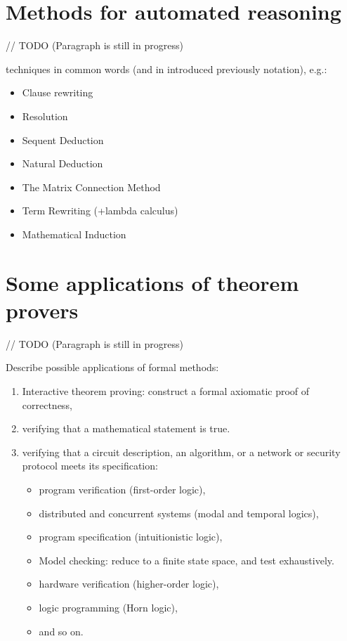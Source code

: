 \documentclass[article]{aaltoseries}
\begin{document}

\section{Methods for automated reasoning}
\label{sec:auto_reasoning}

// TODO (Paragraph is still in progress)

techniques in common words (and in introduced previously notation), e.g.: 
\begin{itemize}
\itemsep0em
	\item Clause rewriting
	\item Resolution
	\item Sequent Deduction
	\item Natural Deduction
	\item The Matrix Connection Method
	\item Term Rewriting (+lambda calculus)
	\item Mathematical Induction
\end{itemize}




\section{Some applications of theorem provers}
\label{sec:applications}

// TODO (Paragraph is still in progress) 

Describe possible applications of formal methods:
\begin{enumerate}
	\itemsep0em
	\item Interactive theorem proving: construct a formal axiomatic proof of correctness, 
	\item verifying that a mathematical statement is true.
	\item verifying that a circuit description, an algorithm, or a network or security protocol meets its specification:
	\begin{itemize}
		\item program verification (first-order logic), 
		\item distributed and concurrent systems (modal and temporal logics), 
		\item program specification (intuitionistic logic),
		\item Model checking: reduce to a finite state space, and test exhaustively.
		\item hardware verification (higher-order logic), 
		\item logic programming (Horn logic), 
		\item and so on.
	\end{itemize}
\end{enumerate}
\end{document}
